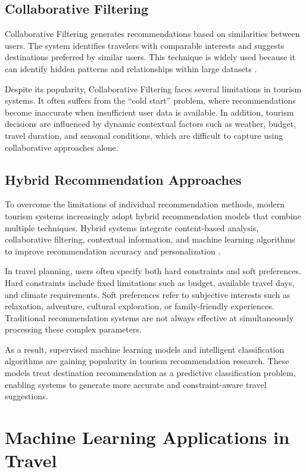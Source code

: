 \subsection{Collaborative Filtering}

Collaborative Filtering generates recommendations based on similarities between users. The system identifies travelers with comparable interests and suggests destinations preferred by similar users. This technique is widely used because it can identify hidden patterns and relationships within large datasets \cite{ricci2015}.

Despite its popularity, Collaborative Filtering faces several limitations in tourism systems. It often suffers from the ``cold start'' problem, where recommendations become inaccurate when insufficient user data is available. In addition, tourism decisions are influenced by dynamic contextual factors such as weather, budget, travel duration, and seasonal conditions, which are difficult to capture using collaborative approaches alone.

\subsection{Hybrid Recommendation Approaches}

To overcome the limitations of individual recommendation methods, modern tourism systems increasingly adopt hybrid recommendation models that combine multiple techniques. Hybrid systems integrate content-based analysis, collaborative filtering, contextual information, and machine learning algorithms to improve recommendation accuracy and personalization \cite{ricci2015}.

In travel planning, users often specify both hard constraints and soft preferences. Hard constraints include fixed limitations such as budget, available travel days, and climate requirements. Soft preferences refer to subjective interests such as relaxation, adventure, cultural exploration, or family-friendly experiences. Traditional recommendation systems are not always effective at simultaneously processing these complex parameters.

As a result, supervised machine learning models and intelligent classification algorithms are gaining popularity in tourism recommendation research. These models treat destination recommendation as a predictive classification problem, enabling systems to generate more accurate and constraint-aware travel suggestions.

\section{Machine Learning Applications in Travel}

